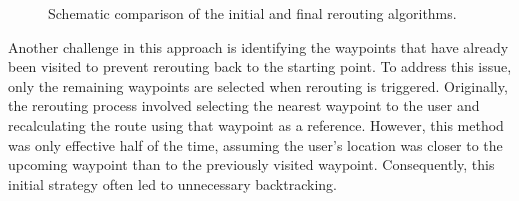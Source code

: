 \begin{figure}[htbp]
\centering
{}
\caption{Schematic comparison of the initial and final rerouting algorithms.}
\label{fig:rerouting-strategy-comparison}
\end{figure}

Another challenge in this approach is identifying the waypoints that have already been visited to prevent rerouting back to the starting point. To address this issue, only the remaining waypoints are selected when rerouting is triggered. Originally, the rerouting process involved selecting the nearest waypoint to the user and recalculating the route using that waypoint as a reference. However, this method was only effective half of the time, assuming the user's location was closer to the upcoming waypoint than to the previously visited waypoint. Consequently, this initial strategy often led to unnecessary backtracking.


